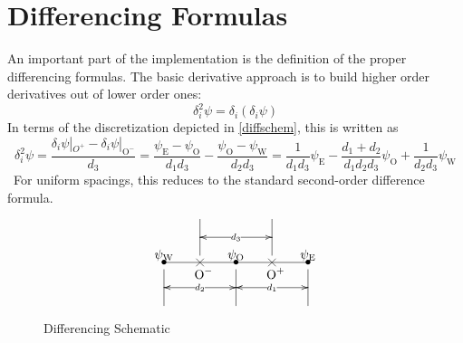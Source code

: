 \documentclass[10pt]{article}
\begin{document}
\section{Differencing Formulas}
An important part of the implementation is the definition of the
proper differencing formulas.  The basic derivative approach is to
build higher order derivatives out of lower order ones:
\begin{equation}
\delta_i^2 \psi = \delta_i\left(\delta_i \psi\right)
\end{equation}
In terms of the discretization depicted in \autoref{diffschem}, this
is written as
\begin{equation}
\delta_i^2 \psi = \frac{\delta_i \psi|_{O^+}-\delta_i
\psi|_{\text{O}^-}}{d_3} 
= \frac{\psi_\text{E}-\psi_\text{O}}{d_1d_3}  
 -\frac{\psi_\text{O}-\psi_\text{W}}{d_2d_3}
= \frac{1}{d_1d_3}\psi_\text{E} - \frac{d_1+d_2}{d_1d_2d_3}\psi_\text{O}
 +\frac{1}{d_2d_3}\psi_\text{W}
\end{equation}\
For uniform spacings, this reduces to the standard second-order
difference formula.

\begin{figure}
\[
\xy
(0,0)*{}; (40,0)*{} **\dir{-};
(0,0)*{\bullet}+(0,2)*{\psi_\text{W}};
(20,0)*{\bullet}+(0,2)*{\psi_\text{O}};
(40,0)*{\bullet}+(0,2)*{\psi_\text{E}};
(9,-1)*{}; (11,1)*{} **\dir{-};
(11,-1)*{}; (9,1)*{} **\dir{-};
(29,-1)*{}; (31,1)*{} **\dir{-};
(31,-1)*{}; (29,1)*{} **\dir{-};
(0,-2)*{}; (0,-12)*{} **\dir{-};
(20,-2)*{}; (20,-12)*{} **\dir{-};
{\ar@{<->}|{d_2} (0,-7)*{};(20,-7)*{}}; 
(40,-2)*{}; (40,-12)*{} **\dir{-};
{\ar@{<->}|{d_1} (20,-7)*{};(40,-7)*{}}; 
(10,2)*{}; (10,12)*{} **\dir{-};
(30,2)*{}; (30,12)*{} **\dir{-};
{\ar@{<->}|{d_3} (10,7)*{};(30,7)*{}};
(11,-3)*{\text{O}^-};
(31,-3)*{\text{O}^+};
\endxy
\]
\caption{Differencing Schematic}\label{diffschem}
\end{figure}
\end{document}
